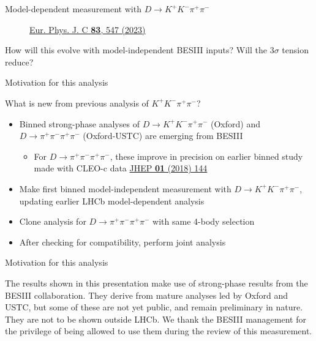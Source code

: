 \documentclass[xcolor={dvipsnames}]{beamer}
\begin{document}
\begin{frame}{Model-dependent measurement with $D\to K^+K^-\pi^+\pi^-$}
\begin{figure}[htb]
\begin{subfigure}{0.5\textwidth}
    \end{subfigure}
    \vspace{-0.5cm}
    \caption*{\tiny\href{https://link.springer.com/article/10.1140/epjc/s10052-023-11560-5}{Eur. Phys. J. C \textbf{83}, 547 (2023)}}
  \end{figure}
  \vspace{-0.5cm}
  \begin{center}
    {\large How will this evolve with model-independent BESIII inputs? Will the $3\sigma$ tension reduce?}
  \end{center}
\end{frame}

\begin{frame}{Motivation for this analysis}
  \begin{center}
    {\Large What is new from previous analysis of $K^+K^-\pi^+\pi^-$?}
  \end{center}
  \begin{itemize}
    \setlength\itemsep{1.0em}
    \item{Binned strong-phase analyses of $D\to K^+K^-\pi^+\pi^-$ (Oxford) and $D\to\pi^+\pi^-\pi^+\pi^-$ (Oxford-USTC) are emerging from BESIII}
    \begin{itemize}
      \item{For $D\to\pi^+\pi^-\pi^+\pi^-$, these improve in precision on earlier binned study made with CLEO-c data \href{https://link.springer.com/article/10.1007/JHEP01(2018)144}{JHEP \textbf{01} (2018) 144}}
    \end{itemize}
    \item{Make first binned model-independent measurement with $D\to K^+K^-\pi^+\pi^-$, updating earlier LHCb model-dependent analysis}
    \item{Clone analysis for $D\to\pi^+\pi^-\pi^+\pi^-$ with same 4-body selection}
    \item{After checking for compatibility, perform joint analysis}
  \end{itemize}
\end{frame}

\begin{frame}{Motivation for this analysis}
  \begin{center}
    {\color{blue}The results shown in this presentation make use of strong-phase results from the BESIII collaboration. They derive from mature analyses led by Oxford and USTC, but some of these are not yet public, and remain preliminary in nature. They are not to be shown outside LHCb. We thank the BESIII management for the privilege of being allowed to use them during the review of this measurement.}
  \end{center}
\end{frame}
\end{document}
